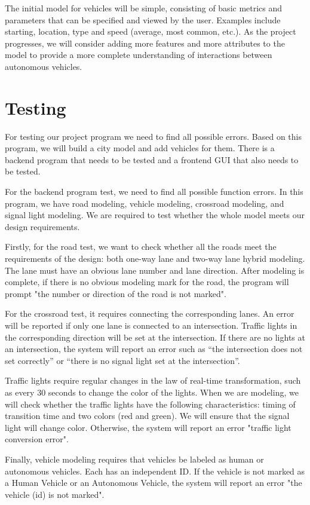 \documentclass[onecolumn, draftclsnofoot,10pt, compsoc]{IEEEtran}
\begin{document}
The initial model for vehicles will be simple, consisting of basic metrics and parameters that can be specified and viewed by the user.
Examples include starting, location, type and speed (average, most common, etc.).
As the project progresses, we will consider adding more features and more attributes to the model to provide a more complete understanding of interactions between autonomous vehicles.
\section{Testing}
For testing our project program we need to find all possible errors.
Based on this program, we will build a city model and add vehicles for them.
There is a backend program that needs to be tested and a frontend GUI that also needs to be tested.

For the backend program test, we need to find all possible function errors.
In this program, we have road modeling, vehicle modeling, crossroad modeling, and signal light modeling.
We are required to test whether the whole model meets our design requirements.

Firstly, for the road test, we want to check whether all the roads meet the requirements of the design: both one-way lane and two-way lane hybrid modeling.
The lane must have an obvious lane number and lane direction.
After modeling is complete, if there is no obvious modeling mark for the road, the program will prompt "the number or direction of the road is not marked".

For the crossroad test, it requires connecting the corresponding lanes.
An error will be reported if only one lane is connected to an intersection.
Traffic lights in the corresponding direction will be set at the intersection.
If there are no lights at an intersection, the system will report an error such as “the intersection does not set correctly” or “there is no signal light set at the intersection”.

Traffic lights require regular changes in the law of real-time transformation, such as every 30 seconds to change the color of the lights.
When we are modeling, we will check whether the traffic lights have the following characteristics: timing of transition time and two colors (red and green).
We will ensure that the signal light will change color.
Otherwise, the system will report an error "traffic light conversion error".

Finally, vehicle modeling requires that vehicles be labeled as human or autonomous vehicles.
Each has an independent ID.
If the vehicle is not marked as a Human Vehicle or an Autonomous Vehicle, the system will report an error "the vehicle (id) is not marked".
\end{document}

